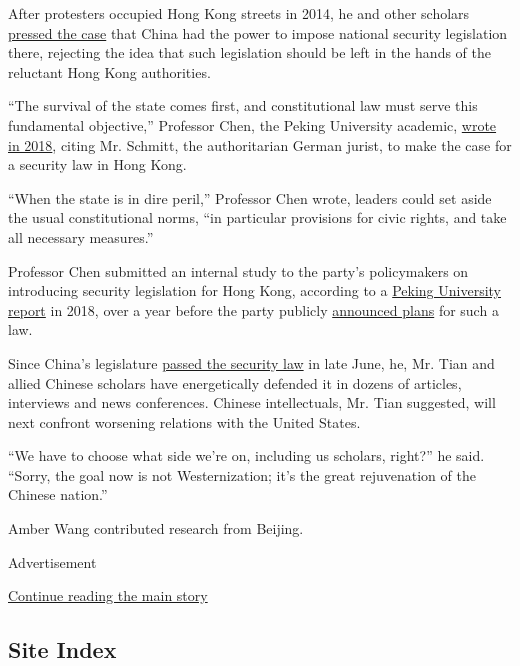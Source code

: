After protesters occupied Hong Kong streets in 2014, he and other
scholars \href{https://opinion.huanqiu.com/article/9CaKrnJGSZs}{pressed
the case} that China had the power to impose national security
legislation there, rejecting the idea that such legislation should be
left in the hands of the reluctant Hong Kong authorities.

``The survival of the state comes first, and constitutional law must
serve this fundamental objective,'' Professor Chen, the Peking
University academic,
\href{http://hk.zijing.org/2018/0122/750657.shtml}{wrote in 2018},
citing Mr. Schmitt, the authoritarian German jurist, to make the case
for a security law in Hong Kong.

``When the state is in dire peril,'' Professor Chen wrote, leaders could
set aside the usual constitutional norms, ``in particular provisions for
civic rights, and take all necessary measures.''

Professor Chen submitted an internal study to the party's policymakers
on introducing security legislation for Hong Kong, according to a
\href{http://www.publiclaw.cn/static/upfile/201807251034548539.pdf}{Peking
University report} in 2018, over a year before the party publicly
\href{https://www.nytimes3xbfgragh.onion/2019/10/31/world/asia/hong-kong-protests-china.html}{announced
plans} for such a law.

Since China's legislature
\href{https://www.nytimes3xbfgragh.onion/2020/06/29/world/asia/china-hong-kong-security-law-rules.html}{passed
the security law} in late June, he, Mr. Tian and allied Chinese scholars
have energetically defended it in dozens of articles, interviews and
news conferences. Chinese intellectuals, Mr. Tian suggested, will next
confront worsening relations with the United States.

``We have to choose what side we're on, including us scholars, right?''
he said. ``Sorry, the goal now is not Westernization; it's the great
rejuvenation of the Chinese nation.''

Amber Wang contributed research from Beijing.

Advertisement

\protect\hyperlink{after-bottom}{Continue reading the main story}

\hypertarget{site-index}{%
\subsection{Site Index}\label{site-index}}

